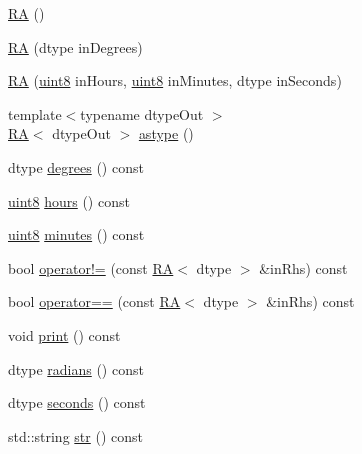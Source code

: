 \begin{DoxyCompactItemize}
\item 
\mbox{\hyperlink{class_num_c_1_1_coordinates_1_1_r_a_a5196fabc335bfd0d3e13c11b9955a08c}{RA}} ()
\item 
\mbox{\hyperlink{class_num_c_1_1_coordinates_1_1_r_a_a694c2d0953ae789b22ca8ea031381b51}{RA}} (dtype in\+Degrees)
\item 
\mbox{\hyperlink{class_num_c_1_1_coordinates_1_1_r_a_a66f414e4b65e1fa0bc1fc76b3b9c6794}{RA}} (\mbox{\hyperlink{namespace_num_c_a60b2e2f49e1ff61059731c154e560869}{uint8}} in\+Hours, \mbox{\hyperlink{namespace_num_c_a60b2e2f49e1ff61059731c154e560869}{uint8}} in\+Minutes, dtype in\+Seconds)
\item 
{\footnotesize template$<$typename dtype\+Out $>$ }\\\mbox{\hyperlink{class_num_c_1_1_coordinates_1_1_r_a}{RA}}$<$ dtype\+Out $>$ \mbox{\hyperlink{class_num_c_1_1_coordinates_1_1_r_a_ab9f6cfbab0fd4def322392631f917846}{astype}} ()
\item 
dtype \mbox{\hyperlink{class_num_c_1_1_coordinates_1_1_r_a_a6993ec638e01b191d7fd7b8c88476a99}{degrees}} () const
\item 
\mbox{\hyperlink{namespace_num_c_a60b2e2f49e1ff61059731c154e560869}{uint8}} \mbox{\hyperlink{class_num_c_1_1_coordinates_1_1_r_a_a85d46e5a7b720aaf60fcf424c0d303e6}{hours}} () const
\item 
\mbox{\hyperlink{namespace_num_c_a60b2e2f49e1ff61059731c154e560869}{uint8}} \mbox{\hyperlink{class_num_c_1_1_coordinates_1_1_r_a_a6e5fab3e72129828e77f4d19750398d4}{minutes}} () const
\item 
bool \mbox{\hyperlink{class_num_c_1_1_coordinates_1_1_r_a_ae0f38f418cc2ee6cf3f320cc85567d55}{operator!=}} (const \mbox{\hyperlink{class_num_c_1_1_coordinates_1_1_r_a}{RA}}$<$ dtype $>$ \&in\+Rhs) const
\item 
bool \mbox{\hyperlink{class_num_c_1_1_coordinates_1_1_r_a_a1f78f39f0fb716ac5bbe4ebeba333725}{operator==}} (const \mbox{\hyperlink{class_num_c_1_1_coordinates_1_1_r_a}{RA}}$<$ dtype $>$ \&in\+Rhs) const
\item 
void \mbox{\hyperlink{class_num_c_1_1_coordinates_1_1_r_a_a5ba8bd67c092332cd02e1ed618dd3ca7}{print}} () const
\item 
dtype \mbox{\hyperlink{class_num_c_1_1_coordinates_1_1_r_a_a6e4a8e6d1dd6556d215759757f1d46f2}{radians}} () const
\item 
dtype \mbox{\hyperlink{class_num_c_1_1_coordinates_1_1_r_a_aa6f63b4ebee9854019a42c523f7981f3}{seconds}} () const
\item 
std\+::string \mbox{\hyperlink{class_num_c_1_1_coordinates_1_1_r_a_a425ed55481f1bfc3e4dc68f4585b14ca}{str}} () const
\end{DoxyCompactItemize}
